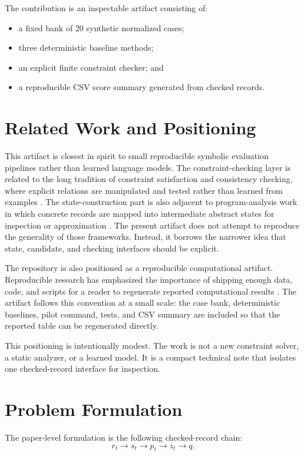 \documentclass[11pt]{article}
\begin{document}
The contribution is an inspectable artifact consisting of:
\begin{itemize}
    \item a fixed bank of 20 synthetic normalized cases;
    \item three deterministic baseline methods;
    \item an explicit finite constraint checker; and
    \item a reproducible CSV score summary generated from checked records.
\end{itemize}

\section{Related Work and Positioning}

This artifact is closest in spirit to small reproducible symbolic evaluation
pipelines rather than learned language models. The constraint-checking layer is
related to the long tradition of constraint satisfaction and consistency
checking, where explicit relations are manipulated and tested rather than
learned from examples \cite{mackworth1977}. The state-construction part is also
adjacent to program-analysis work in which concrete records are mapped into
intermediate abstract states for inspection or approximation
\cite{cousot1977}. The present artifact does not attempt to reproduce the
generality of those frameworks. Instead, it borrows the narrower idea that
state, candidate, and checking interfaces should be explicit.

The repository is also positioned as a reproducible computational artifact.
Reproducible research has emphasized the importance of shipping enough data,
code, and scripts for a reader to regenerate reported computational results
\cite{claerbout1992}. The artifact follows this convention at a small scale:
the case bank, deterministic baselines, pilot command, tests, and CSV summary
are included so that the reported table can be regenerated directly.

This positioning is intentionally modest. The work is not a new constraint
solver, a static analyzer, or a learned model. It is a compact technical note
that isolates one checked-record interface for inspection.

\section{Problem Formulation}

The paper-level formulation is the following checked-record chain:
\[
r_t \rightarrow s_t \rightarrow p_t \rightarrow z_t \rightarrow q.
\]
\end{document}
